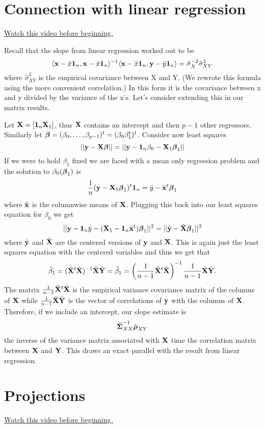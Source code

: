 \section{Connection with linear regression}
\href{https://www.youtube.com/watch?v=FcWYZRAHFfM&index=24&list=PLpl-gQkQivXhdgUCdaUQcdb31CRe8Mm2y}{Watch this video before beginning.}

\label{sec:lslin}
Recall that the slope from linear regression worked out to be
$$
\langle \mathbf{x} - \bar x \mathbf{1}_n, \mathbf{x} - \bar x \mathbf{1}_n \rangle^{-1}\langle \mathbf{x} - \bar x\mathbf{1}_n, \mathbf{y} - \bar y \mathbf{1}_n \rangle 
= \hat \sigma^{-2}_{X} \hat \sigma^2_{XY}
$$
where $\hat \sigma^2_{XY}$ is the empirical covariance between X and Y. 
(We rewrote this formula using the more convenient correlation.) In this form it is the
covariance between x and y divided by the variance of the x's. Let's consider
extending this in our matrix results.

Let $\mathbf{X} = [\mathbf{1}_n \mathbf{X}_1]$, thus $\mathbf{X}$ contains an intercept and then $p-1$ other
regressors. Similarly let $\boldsymbol{\beta} = (\beta_0, \ldots, \beta_{p-1})^t = (\beta_0 \beta_1^t)^t$. Consider now least squares
$$
||\mathbf{y} - \mathbf{X} \boldsymbol{\beta}||
=||\mathbf{y} - \mathbf{1}_n \beta_0 - \mathbf{X}_1 \boldsymbol{\beta}_1||
$$
If we were to hold $\beta_1$ fixed we are faced with a mean only regression
problem and the solution to $\beta_0(\boldsymbol{\beta}_1)$ is 
$$
\frac{1}{n}(\mathbf{y} - \mathbf{X}_1 \boldsymbol{\beta}_1)^t \mathbf{1}_n
= \bar y - \bar {\mathbf{x}}^t \boldsymbol{\beta}_1
$$
where $\bar {\mathbf{x}}$ is the columnwise means of $\mathbf{X}$. Plugging this back into
our least squares equation for $\beta_0$ we get
$$
||\mathbf{y} - \mathbf{1}_n \bar y - (\mathbf{X}_1 - \mathbf{1}_n \bar {\mathbf{x}}^t )\boldsymbol{\beta}_1||^2
= || \tilde {\mathbf{y}} - \tilde {\mathbf{X}}\boldsymbol{\beta}_1||^2
$$
where $\tilde {\mathbf{y}}$ and $\tilde {\mathbf{X}}$ are the centered versions of 
$\mathbf{y}$ and $\mathbf{X}$. This is again just the least squares equation with
the centered variables and thus we get that
$$
\hat \beta_1 = (\tilde {\mathbf{X}}^t \tilde {\mathbf{X}})^{-1} \tilde {\mathbf{X}} \tilde {\mathbf{Y}}
=
\hat \beta_1 = \left(\frac{1}{n-1}\tilde {\mathbf{X}}^t \tilde {\mathbf{X}}\right)^{-1}  
\frac{1}{n-1} \tilde {\mathbf{X}} \tilde {\mathbf{Y}}.
$$
The matrix $\frac{1}{n-1}\tilde {\mathbf{X}}^t \tilde {\mathbf{X}}$ is the empirical 
variance covariance matrix of the columns of $\mathbf{X}$ while 
$\frac{1}{n-1} \tilde {\mathbf{X}} \tilde {\mathbf{Y}}$ is the vector of correlations
of $\mathbf{y}$ with the columns of $\mathbf{X}$. Therefore, if we include an intercept,
our slope estimate is 
$$
\hat {\boldsymbol{\Sigma}}_{XX}^{-1} \hat {\boldsymbol{\rho}}_{XY}
$$
the inverse of the variance matrix associated with $\mathbf{X}$ time the
correlation matrix between $\mathbf{X}$ and $\mathbf{Y}$. This draws an exact
parallel with the result from linear regression.

\section{Projections}
\href{https://www.youtube.com/watch?v=UM7OX4qihGs&index=25&list=PLpl-gQkQivXhdgUCdaUQcdb31CRe8Mm2y}{Watch this video before beginning.}

